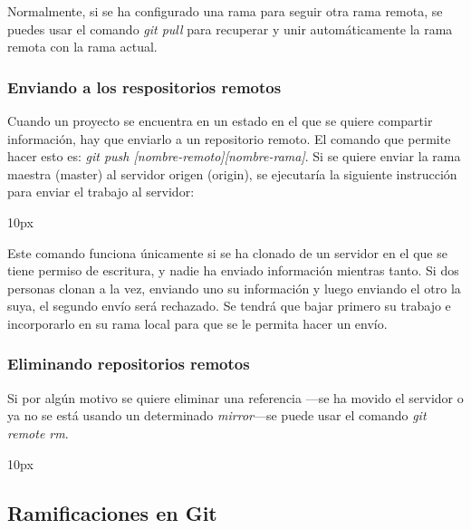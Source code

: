 Normalmente, si se ha configurado una rama para seguir otra rama remota, se puedes usar el comando {\it git pull} para recuperar y unir automáticamente la rama remota con la rama actual.

\subsubsection{Enviando a los respositorios remotos}

Cuando un proyecto se encuentra en un estado en el que se quiere compartir información, hay que enviarlo a un repositorio remoto. El comando que permite hacer esto es: {\it git push [nombre-remoto][nombre-rama]}. Si se quiere enviar la rama maestra (master) al servidor origen (origin), se ejecutaría la siguiente instrucción para enviar el trabajo al servidor:

\begin{center}{
	\fboxsep 10px
	}
\end{center}

Este comando funciona únicamente si se ha clonado de un servidor en el que se tiene permiso de escritura, y nadie ha enviado información mientras tanto. Si dos personas clonan a la vez, enviando uno su información y luego enviando el otro la suya, el segundo envío será rechazado. Se tendrá que bajar primero su trabajo e incorporarlo en su rama local para que se le permita hacer un envío.

\subsubsection{Eliminando repositorios remotos}

Si por algún motivo se quiere eliminar una referencia ---se ha movido el servidor o ya no se está usando un determinado {\it mirror}---se puede usar el comando {\it git remote rm}.

\begin{center}{
	\fboxsep 10px
	}
\end{center}

%
%
\subsection{Ramificaciones en Git}

